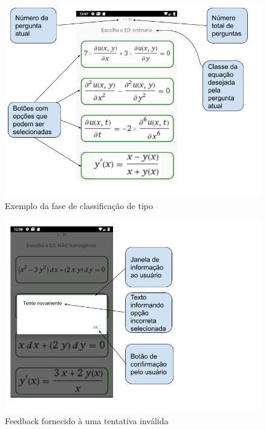 \begin{figure}[H]
\centering
\caption{Exemplo da fase de classificação de tipo}
\includegraphics[scale=0.52]{figuras/ex_ed_ordinaria.png}
\end{figure}

\begin{figure}[H]
\centering
\caption{Feedback fornecido à uma tentativa inválida}
\includegraphics[scale=0.52]{figuras/tente_novamente.png}
\end{figure}

